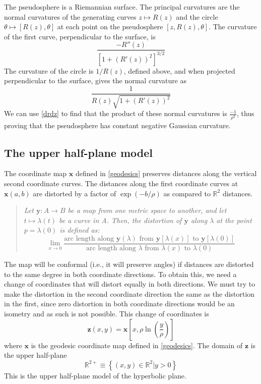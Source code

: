 \documentclass[letterpaper,titlepage]{article}
\begin{document}
The pseudosphere is a Riemannian surface.
The principal curvatures are the normal curvatures of the generating curves $z \mapsto R(z)$ and the circle $\theta \mapsto [R(z), \theta]$ at each point on the pseudosphere $[z, R(z), \theta]$.
The curvature of the first curve, perpendicular to the surface, is
\[ \frac{-R''(z)}{[1+(R'(z))^2]^{3/2}} \]
The curvature of the circle is $1/R(z)$, defined above, and when projected perpendicular to the surface, gives the normal curvature as
\[ \frac{1}{R(z)\sqrt{1+{(R'(z))^2}}} \]
We can use \eqref{drdz} to find that the product of these normal curvatures is $\frac{-1}{\rho^2}$, thus proving that the pseudosphere has constant negative Gaussian curvature.\cite{crochetplane}

\subsection{The upper half-plane model}
The coordinate map $\mathbf{x}$ defined in \ref{geodesics} preserves distances along the vertical second coordinate curves.
The distances along the first coordinate curves at $\mathbf{x}(a,b)$ are distorted by a factor of $\exp(-b/\rho)$ as compared to $\mathbb{R}^2$ distances.
\begin{quote}
\emph{
Let $\mathbf{y}:A \to B$ be a map from one metric space to another, and let $t \mapsto \lambda(t)$ be a curve in A. Then, the \emph{distortion} of $\mathbf{y}$ along $\lambda$ at the point $p = \lambda(0)$ is defined as:
}
\[ \lim_{x \to 0}
\frac{\text{arc length along }\mathbf{y}(\lambda)\text{ from }\mathbf{y}[\lambda(x)]\text{ to }\mathbf{y}[\lambda(0)]}
{\text{arc length along }\lambda\text{ from }\lambda(x)\text{ to }\lambda(0)}
\]
\end{quote}
The map will be conformal (i.e., it will preserve angles) if distances are distorted to the same degree in both coordinate directions.
To obtain this, we need a change of coordinates that will distort equally in both directions.
We must try to make the distortion in the second coordinate direction the same as the distortion in the first, since zero distortion in both coordinate directions would be an isometry and as such is not possible.
This change of coordinates is
\[ \mathbf{z}(x,y) = \mathbf{x} \left[x, \rho \ln \left(\frac{y}{\rho} \right)\right] \]
where $\mathbf{x}$ is the geodesic coordinate map defined in \ref{geodesics}.
The domain of $\mathbf{z}$ is the upper half-plane
\[ \mathbb{R}^{2+} \equiv \left\{ (x,y) \in \mathbb{R}^2 | y > 0 \right\} \]
This is the upper half-plane model of the hyperbolic plane.
\end{document}
